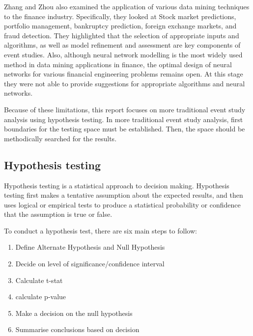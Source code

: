 Zhang and Zhou\cite{golden_nuggets} also examined the application of various data mining techniques to the finance industry. Specifically, they looked at Stock market predictions, portfolio management, bankruptcy prediction, foreign exchange markets, and fraud detection. They highlighted that the selection of appropriate inputs and algorithms, as well as model refinement and assessment are key components of event studies. Also, although neural network modelling is the most widely used method in data mining applications in finance, the optimal design of neural networks for various financial engineering problems remains open. At this stage they were not able to provide suggestions for appropriate algorithms and neural networks.

Because of these limitations, this report focuses on more traditional event study analysis using hypothesis testing. In more traditional event study analysis, first boundaries for the testing space must be established. Then, the space should be methodically searched for the results\cite{data_mining_Keogh}.

\subsection{Hypothesis testing}\label{subsec:hyp_test}

Hypothesis testing is a statistical approach to decision making.  Hypothesis testing first makes a tentative assumption about the expected results, and then uses logical or empirical tests to produce a statistical probability or confidence that the assumption is true or false.

To conduct a hypothesis test, there are six main steps to follow\cite{black_stats}:
\begin{enumerate}
    \item Define Alternate Hypothesis and Null Hypothesis
    \item Decide on level of significance/confidence interval
    \item Calculate t-stat
    \item calculate p-value
    \item Make a decision on the null hypothesis
    \item Summarise conclusions based on decision
\end{enumerate}

